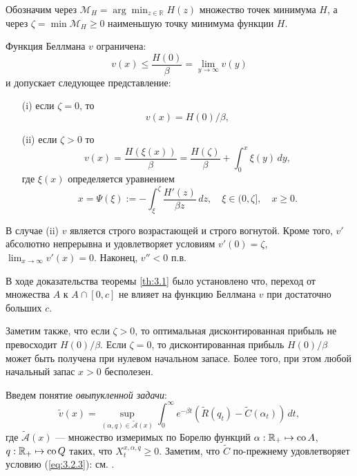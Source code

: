 Обозначим через $\mathscr M_H=\arg\min_{z\in\mathbb R} H(z)$ множество точек минимума $H$, а через $\zeta=\min\mathscr M_H\ge 0$ наименьшую точку минимума функции $H$.
\begin{theorem} \label{th:3.1}
Функция Беллмана $v$ ограничена:
$$ v(x)\le \frac{H(0)}{\beta}=\lim_{y\to\infty} v(y)$$
и допускает следующее представление:
\begin{itemize}
\item[(i)] если $\zeta=0$, то
\begin{equation} \label{eq:3.2.9}
v(x)=H(0)/\beta,
\end{equation}
\item[(ii)] если $\zeta>0$ то
\begin{equation} \label{eq:3.2.10}
v(x)=\frac{H(\xi(x))}{\beta}=\frac{H(\zeta)}{\beta}+\int_0^x\xi(y)\,dy,
\end{equation}
где $\xi(x)$ определяется уравнением
$$x=\Psi(\xi):=-\int_\xi^{\zeta}\frac{H'(z)}{\beta z}\,dz,\quad \xi\in (0,\zeta],\quad x\ge 0.$$
\end{itemize}
В случае (ii) $v$ является строго возрастающей и строго вогнутой. Кроме того, $v'$ абсолютно непрерывна и удовлетворяет условиям $v'(0)=\zeta$, $\lim_{x\to\infty} v'(x)=0.$ Наконец, $v''<0$ п.в.
\end{theorem}

В ходе доказательства теоремы \ref{th:3.1} было установлено что, переход от множества $A$ к $A\cap [0,c]$ не влияет на функцию Беллмана $v$ при достаточно больших $c$.

Заметим также, что если $\zeta>0$, то оптимальная дисконтированная прибыль не превосходит $H(0)/\beta$. Если $\zeta=0$, то дисконтированная прибыль $H(0)/\beta$ может быть получена при нулевом начальном запасе. Более того, при этом любой начальный запас $x>0$ бесполезен.

Введем понятие \emph{овыпукленной задачи}:
\begin{equation} \label{eq:3.2.17}
\widetilde v(x)=\sup_{(\alpha,q)\in\widetilde{\mathscr A}(x)}\int_0^\infty e^{-\beta t}(\widetilde R(q_t)-\widetilde C(\alpha_t))\,dt,
\end{equation}
где $\widetilde{\mathscr A}(x)$ --- множество измеримых по Борелю функций $\alpha:\mathbb R_+\mapsto{\rm co\,} A$, $q:\mathbb R_+\mapsto {\rm co\,} Q$ таких, что $X_t^{x,\alpha,q}\ge 0$. Заметим, что $\widetilde C$ по-прежнему удовлетворяет условию (\ref{eq:3.2.3}): см. \cite[глава E, предложение 1.3.9(ii)]{HirUrrLem01}.

